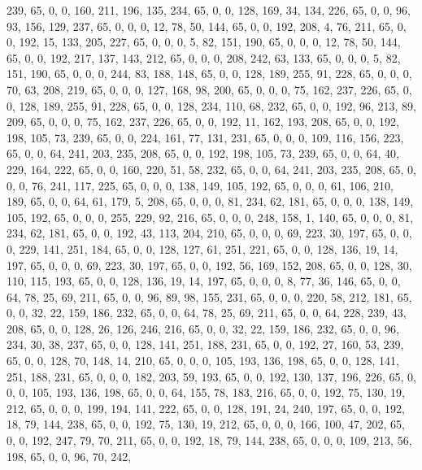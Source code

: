 \begin{DoxyCode}
       239, 65, 0, 0, 160, 211, 196, 135, 234, 65, 0, 0, 128, 169, 34, 134, 226, 65, 0, 0, 96, 93, 156, 129, 237,
       65, 0, 0, 0, 12, 78, 50, 144, 65, 0, 0, 192, 208, 4, 76, 211, 65, 0, 0, 192, 15, 133, 205, 227, 65, 0, 0, 0,
       5, 82, 151, 190, 65, 0, 0, 0, 12, 78, 50, 144, 65, 0, 0, 192, 217, 137, 143, 212, 65, 0, 0, 0, 208, 242,
       63, 133, 65, 0, 0, 0, 5, 82, 151, 190, 65, 0, 0, 0, 244, 83, 188, 148, 65, 0, 0, 128, 189, 255, 91, 228, 65,
       0, 0, 0, 70, 63, 208, 219, 65, 0, 0, 0, 127, 168, 98, 200, 65, 0, 0, 0, 75, 162, 237, 226, 65, 0, 0, 128,
       189, 255, 91, 228, 65, 0, 0, 128, 234, 110, 68, 232, 65, 0, 0, 192, 96, 213, 89, 209, 65, 0, 0, 0, 75, 162,
       237, 226, 65, 0, 0, 192, 11, 162, 193, 208, 65, 0, 0, 192, 198, 105, 73, 239, 65, 0, 0, 224, 161, 77, 131, 231,
       65, 0, 0, 0, 109, 116, 156, 223, 65, 0, 0, 64, 241, 203, 235, 208, 65, 0, 0, 192, 198, 105, 73, 239, 65, 0,
       0, 64, 40, 229, 164, 222, 65, 0, 0, 160, 220, 51, 58, 232, 65, 0, 0, 64, 241, 203, 235, 208, 65, 0, 0, 0,
       76, 241, 117, 225, 65, 0, 0, 0, 138, 149, 105, 192, 65, 0, 0, 0, 61, 106, 210, 189, 65, 0, 0, 64, 61, 179, 5,
       208, 65, 0, 0, 0, 81, 234, 62, 181, 65, 0, 0, 0, 138, 149, 105, 192, 65, 0, 0, 0, 255, 229, 92, 216, 65, 0,
       0, 0, 248, 158, 1, 140, 65, 0, 0, 0, 81, 234, 62, 181, 65, 0, 0, 192, 43, 113, 204, 210, 65, 0, 0, 0, 69,
       223, 30, 197, 65, 0, 0, 0, 229, 141, 251, 184, 65, 0, 0, 128, 127, 61, 251, 221, 65, 0, 0, 128, 136, 19, 14,
       197, 65, 0, 0, 0, 69, 223, 30, 197, 65, 0, 0, 192, 56, 169, 152, 208, 65, 0, 0, 128, 30, 110, 115, 193, 65,
       0, 0, 128, 136, 19, 14, 197, 65, 0, 0, 0, 8, 77, 36, 146, 65, 0, 0, 64, 78, 25, 69, 211, 65, 0, 0, 96, 89,
       98, 155, 231, 65, 0, 0, 0, 220, 58, 212, 181, 65, 0, 0, 32, 22, 159, 186, 232, 65, 0, 0, 64, 78, 25, 69, 211,
       65, 0, 0, 64, 228, 239, 43, 208, 65, 0, 0, 128, 26, 126, 246, 216, 65, 0, 0, 32, 22, 159, 186, 232, 65, 0,
       0, 96, 234, 30, 38, 237, 65, 0, 0, 128, 141, 251, 188, 231, 65, 0, 0, 192, 27, 160, 53, 239, 65, 0, 0, 128,
       70, 148, 14, 210, 65, 0, 0, 0, 105, 193, 136, 198, 65, 0, 0, 128, 141, 251, 188, 231, 65, 0, 0, 0, 182, 203,
       59, 193, 65, 0, 0, 192, 130, 137, 196, 226, 65, 0, 0, 0, 105, 193, 136, 198, 65, 0, 0, 64, 155, 78, 183,
       216, 65, 0, 0, 192, 75, 130, 19, 212, 65, 0, 0, 0, 199, 194, 141, 222, 65, 0, 0, 128, 191, 24, 240, 197, 65,
       0, 0, 192, 18, 79, 144, 238, 65, 0, 0, 192, 75, 130, 19, 212, 65, 0, 0, 0, 166, 100, 47, 202, 65, 0, 0, 192,
       247, 79, 70, 211, 65, 0, 0, 192, 18, 79, 144, 238, 65, 0, 0, 0, 109, 213, 56, 198, 65, 0, 0, 96, 70, 242,

\end{DoxyCode}

